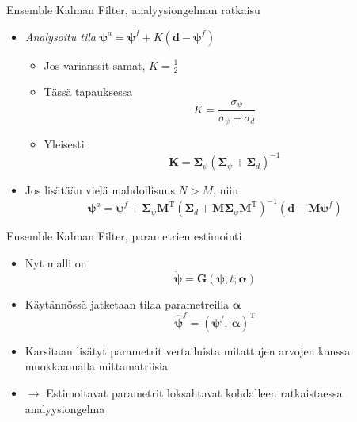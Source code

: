 \documentclass{beamer}
\begin{document}



\begin{frame}{Ensemble Kalman Filter, analyysiongelman ratkaisu}

\begin{itemize}
\item \emph{Analysoitu tila} $\boldsymbol{\psi}^a = \boldsymbol{\psi}^f + K\left(\boldsymbol{d}-\boldsymbol{\psi}^f\right)$
\begin{itemize}
\item Jos varianssit samat, $K = \frac{1}{2}$
\item Tässä tapauksessa \[ K = \frac{\sigma_\psi}{\sigma_\psi+\sigma_d} \]
\item Yleisesti \[ \mathbf{K} = \boldsymbol{\Sigma}_\psi\left(\boldsymbol{\Sigma}_\psi+\boldsymbol{\Sigma}_d\right)^{-1} \]
\end{itemize}
\item \pause Jos lisätään vielä mahdollisuus $N > M$, niin 
\[
\boldsymbol{\psi}^a = \boldsymbol{\psi}^f + \boldsymbol{\Sigma}_\psi \mathbf{M}^\mathrm{T} \left(\boldsymbol{\Sigma}_d+\mathbf{M}\boldsymbol{\Sigma}_\psi\mathbf{M}^\mathrm{T}\right)^{-1}\left(\boldsymbol{d}-\mathbf{M}\boldsymbol{\psi}^f\right)
\]
\end{itemize}

\end{frame}

\begin{frame}{Ensemble Kalman Filter, parametrien estimointi}

\begin{itemize}
\item Nyt malli on
\[
\boldsymbol{\dot{\psi}} = \boldsymbol{G}(\boldsymbol{\psi},t;\boldsymbol{\alpha})
\]
\item Käytännössä jatketaan tilaa parametreilla $\boldsymbol{\alpha}$
\[ \boldsymbol{\hat{\psi}}^f = \left(\boldsymbol{\psi}^f,~\boldsymbol{\alpha}\right)^\mathrm{T} \]
\item Karsitaan lisätyt parametrit vertailuista mitattujen arvojen kanssa muokkaamalla mittamatriisia
\item $\rightarrow$ Estimoitavat parametrit loksahtavat kohdalleen ratkaistaessa analyysiongelma
\end{itemize}

\end{frame}
\end{document}
